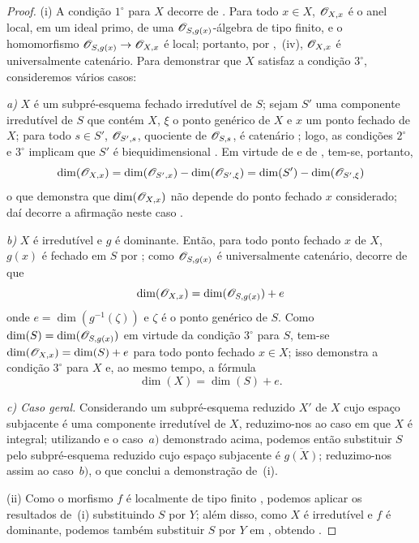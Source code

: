 \begin{proof}
(i) A condição $1^\circ$ para $X$ decorre de .
Para todo $x\in X$, $\mathscr{O}_{X,x}$ é o anel local, em um ideal primo, de uma $\mathscr{O}_{S,g(x)}$-álgebra de tipo finito, e o homomorfismo $\sh{O}_{S,g(x)}\to\sh{O}_{X,x}$
é local; portanto, por ,~(iv), $\mathscr{O}_{X,x}$ é universalmente catenário.
Para demonstrar que $X$ satisfaz a condição $3^\circ$, consideremos vários casos:

\emph{a)} $X$ é um subpré-esquema fechado irredutível de $S$; sejam $S'$ uma componente irredutível de $S$ que contém $X$, $\xi$ o ponto genérico de $X$ e $x$ um ponto fechado de $X$; para todo $s\in S'$, $\mathscr{O}_{S',s}$, quociente de $\mathscr{O}_{S,s}$, é catenário ; logo, as condições $2^\circ$ e $3^\circ$ implicam que $S'$ é biequidimensional .
Em virtude de  e de , tem-se, portanto,
\[
  \dim(\mathscr{O}_{X,x})=\dim(\mathscr{O}_{S',x})-\dim(\mathscr{O}_{S',\xi})
  =\dim(S')-\dim(\mathscr{O}_{S',\xi})
\]
o que demonstra que $\dim(\mathscr{O}_{X,x})$ não depende do ponto fechado $x$ considerado; daí decorre a afirmação neste caso .

\emph{b)} $X$ é irredutível e $g$ é dominante.
Então, para todo ponto fechado $x$ de $X$, $g(x)$ é fechado em $S$ por ; como $\mathscr{O}_{S,g(x)}$ é universalmente catenário, decorre de  que
\[
  \dim(\mathscr{O}_{X,x})=\dim(\mathscr{O}_{S,g(x)})+e
\]
onde $e=\dim(g^{-1}(\zeta))$ e $\zeta$ é o ponto genérico de $S$.
Como $\dim(S)=\dim(\mathscr{O}_{S,g(x)})$ em virtude da condição $3^\circ$ para $S$, tem-se $\dim(\mathscr{O}_{X,x})=\dim(S)+e$ para todo ponto fechado $x\in X$; isso demonstra a condição $3^\circ$ para $X$  e, ao mesmo tempo, a fórmula
\begin{equation}
\label{IV.10.6.1.4}
\tag{10.6.1.4}
\dim(X)=\dim(S)+e.
\end{equation}

\emph{c) Caso geral.}
Considerando um subpré-esquema reduzido $X'$ de $X$ cujo espaço subjacente é uma componente irredutível de $X$, reduzimo-nos ao caso em que $X$ é integral; utilizando  e o caso~$a)$ demonstrado acima, podemos então substituir $S$ pelo subpré-esquema reduzido cujo espaço subjacente é $\overline{g(X)}$; reduzimo-nos assim ao caso~$b)$, o que conclui a demonstração de~(i).

(ii) Como o morfismo $f$ é localmente de tipo finito , podemos aplicar os resultados de~(i) substituindo $S$ por $Y$; além disso, como $X$ é irredutível e $f$ é dominante, podemos também substituir $S$ por $Y$ em , obtendo .


\end{proof}
